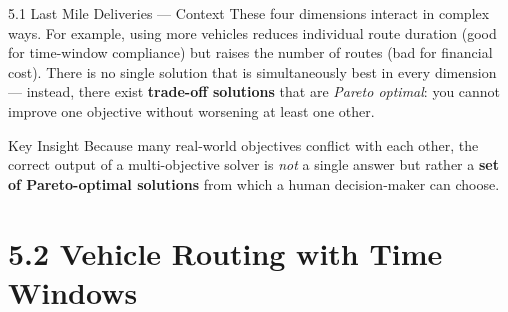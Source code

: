 \documentclass[aspectratio=169,10pt]{beamer}
\begin{document}
\begin{frame}[allowframebreaks]{5.1 Last Mile Deliveries — Context}
  These four dimensions interact in complex ways.  For example, using more
  vehicles reduces individual route duration (good for time-window
  compliance) but raises the number of routes (bad for financial cost).
  There is no single solution that is simultaneously best in every dimension
  --- instead, there exist \textbf{trade-off solutions} that are
  \emph{Pareto optimal}: you cannot improve one objective without worsening
  at least one other.

  \begin{alertblock}{Key Insight}
    Because many real-world objectives conflict with each other, the correct
    output of a multi-objective solver is \emph{not} a single answer but
    rather a \textbf{set of Pareto-optimal solutions} from which a human
    decision-maker can choose.
  \end{alertblock}

\end{frame}

\section{5.2 Vehicle Routing with Time Windows}
\end{document}
